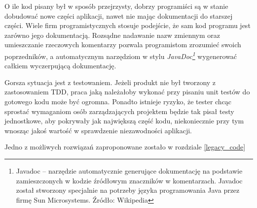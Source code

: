 O ile kod pisany był w sposób przejrzysty, dobrzy programiści są w stanie dobudować nowe części aplikacji, nawet nie mając dokumentacji do starszej części. Wiele firm programistycznych stosuje podejście, że sam kod programu jest zarówno jego dokumentacją. Rozsądne nadawanie nazw zmiennym oraz umieszczanie rzeczowych komentarzy pozwala programistom zrozumieć swoich poprzedników, a automatycznym narzędziom w stylu \textit{JavaDoc\footnote{Javadoc – narzędzie automatycznie generujące dokumentację na podstawie zamieszczonych w kodzie źródłowym znaczników w komentarzach. Javadoc został stworzony specjalnie na potrzeby języka programowania Java przez firmę Sun Microsystems. Źródło: Wikipedia}} wygenerować całkiem wyczerpującą dokumentację.

Gorsza sytuacja jest z testowaniem. Jeżeli produkt nie był tworzony z zastosowaniem TDD, praca jaką należałoby wykonać przy pisaniu unit testów do gotowego kodu może być ogromna. Ponadto istnieje ryzyko, że tester chcąc sprostać wymaganiom osób zarządzających projektem będzie tak pisał testy jednostkowe, aby pokrywały jak największą część kodu, niekoniecznie przy tym wnosząc jakoś wartość w sprawdzenie niezawodności aplikacji.

Jedno z możliwych rozwiązań zaproponowane zostało w rozdziale \ref{legacy_code}